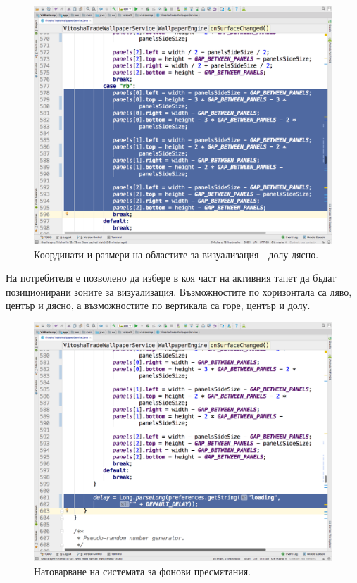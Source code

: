 \documentclass[book,14pt,oneside,openany]{memoir}
\begin{document}
\begin{figure}[h]
  \centering
  \includegraphics[height=0.45\pdfpageheight]{pic0076}
  \caption{Координати и размери на областите за визуализация - долу-дясно.}
\label{fig:pic0076}
\end{figure}
\FloatBarrier

На потребителя е позволено да избере в коя част на активния тапет да бъдат позиционирани зоните за визуализация. Възможностите по хоризонтала са ляво, център и дясно, а възможностите по вертикала са горе, център и долу. 

\begin{figure}[h]
  \centering
  \includegraphics[height=0.45\pdfpageheight]{pic0077}
  \caption{Натоварване на системата за фонови пресмятания.}
\label{fig:pic0077}
\end{figure}
\FloatBarrier
\end{document}
